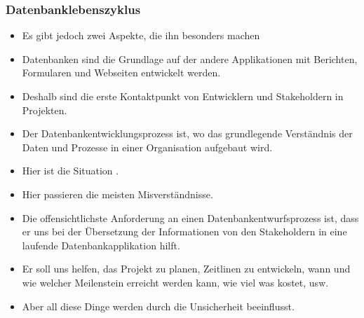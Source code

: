 \documentclass[aspectratio=169,mathserif,notheorems]{beamer}%
\begin{document}
\begin{frame}%
\frametitle{Datenbanklebenszyklus}%
\begin{itemize}%
%
%
%
%
%
\item<3-> Es gibt jedoch zwei Aspekte, die ihn besonders machen%
%
\item<6-> Datenbanken sind die Grundlage auf der andere Applikationen mit Berichten, Formularen und Webseiten entwickelt werden.%
%
\item<7-> Deshalb sind die erste Kontaktpunkt von Entwicklern und Stakeholdern in Projekten.%
%
\item<8-> Der Datenbankentwicklungsprozess ist, wo das grundlegende Verständnis der Daten und Prozesse in einer Organisation aufgebaut wird.%
%
\item<9-> Hier ist die Situation .%
%
\item<10-> Hier passieren die meisten Misverständnisse.%
%
\item<11-> Die offensichtlichste Anforderung an einen Datenbankentwurfsprozess ist, dass er uns bei der Übersetzung der Informationen von den Stakeholdern in eine laufende Datenbankapplikation hilft.%
%
\item<12-> Er soll uns helfen, das Projekt zu planen, Zeitlinen zu entwickeln, wann und wie welcher Meilenstein erreicht werden kann, wie viel was kostet, usw.%
%
\item<13-> Aber all diese Dinge werden durch die Unsicherheit beeinflusst.%
\end{itemize}%
\end{frame}%
%
\end{document}
